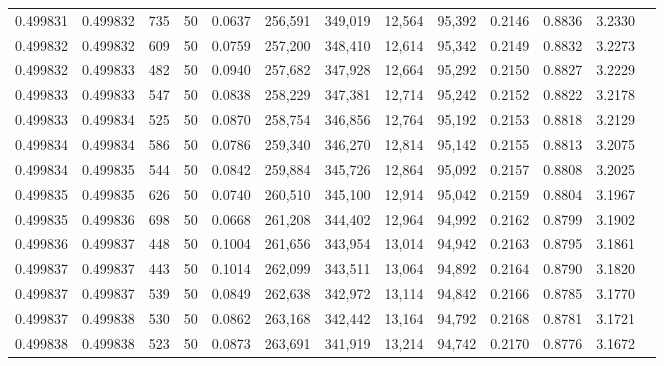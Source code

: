 \begin{tabular}{rrrrrrrrrrrrr}
0.499831 & 0.499832 &   735 &  50 &                                     0.0637 & 256,591 & 349,019 &  12,564 &  95,392 & 0.2146 & 0.8836 & 3.2330 \\
0.499832 & 0.499832 &   609 &  50 &                                     0.0759 & 257,200 & 348,410 &  12,614 &  95,342 & 0.2149 & 0.8832 & 3.2273 \\
0.499832 & 0.499833 &   482 &  50 &                                     0.0940 & 257,682 & 347,928 &  12,664 &  95,292 & 0.2150 & 0.8827 & 3.2229 \\
0.499833 & 0.499833 &   547 &  50 &                                     0.0838 & 258,229 & 347,381 &  12,714 &  95,242 & 0.2152 & 0.8822 & 3.2178 \\
0.499833 & 0.499834 &   525 &  50 &                                     0.0870 & 258,754 & 346,856 &  12,764 &  95,192 & 0.2153 & 0.8818 & 3.2129 \\
0.499834 & 0.499834 &   586 &  50 &                                     0.0786 & 259,340 & 346,270 &  12,814 &  95,142 & 0.2155 & 0.8813 & 3.2075 \\
0.499834 & 0.499835 &   544 &  50 &                                     0.0842 & 259,884 & 345,726 &  12,864 &  95,092 & 0.2157 & 0.8808 & 3.2025 \\
0.499835 & 0.499835 &   626 &  50 &                                     0.0740 & 260,510 & 345,100 &  12,914 &  95,042 & 0.2159 & 0.8804 & 3.1967 \\
0.499835 & 0.499836 &   698 &  50 &                                     0.0668 & 261,208 & 344,402 &  12,964 &  94,992 & 0.2162 & 0.8799 & 3.1902 \\
0.499836 & 0.499837 &   448 &  50 &                                     0.1004 & 261,656 & 343,954 &  13,014 &  94,942 & 0.2163 & 0.8795 & 3.1861 \\
0.499837 & 0.499837 &   443 &  50 &                                     0.1014 & 262,099 & 343,511 &  13,064 &  94,892 & 0.2164 & 0.8790 & 3.1820 \\
0.499837 & 0.499837 &   539 &  50 &                                     0.0849 & 262,638 & 342,972 &  13,114 &  94,842 & 0.2166 & 0.8785 & 3.1770 \\
0.499837 & 0.499838 &   530 &  50 &                                     0.0862 & 263,168 & 342,442 &  13,164 &  94,792 & 0.2168 & 0.8781 & 3.1721 \\
0.499838 & 0.499838 &   523 &  50 &                                     0.0873 & 263,691 & 341,919 &  13,214 &  94,742 & 0.2170 & 0.8776 & 3.1672 \\

\end{tabular}
